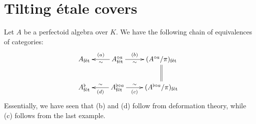 \documentclass{article}
\begin{document}
\section{Tilting \'etale covers}

Let $A$ be a perfectoid algebra over $K$. We have the following chain of 
equivalences of categories: 
\[\xymatrix{
  A_\fet
    & \ar[l]^-\sim_-{(a)} A^{\circ a}_\fet \ar[r]_-\sim^-{(b)} 
    & (A^{\circ a}/\pi)_\fet \ar@{=}[d] \\
  A^\flat_\fet
    & \ar[l]_-\sim^-{(d)} A^{\flat\circ a}_\fet \ar[r]^-\sim_-{(c)} 
    & (A^{\flat\circ a}/\pi)_\fet
}\]
Essentially, we have seen that (b) and (d) follow from deformation theory, 
while (c) follows from the last example. 







\end{document}
